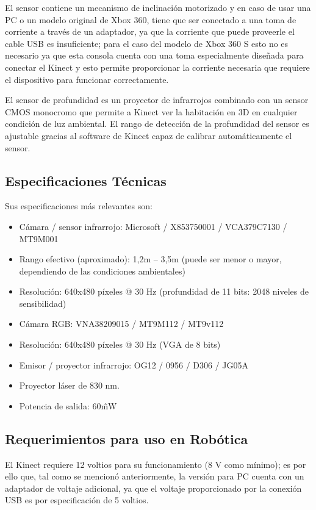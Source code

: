 El sensor contiene un mecanismo de inclinación motorizado y en caso de usar una PC o un modelo original de Xbox 360, tiene que ser conectado a una toma de corriente a través de un adaptador, ya que la corriente que puede proveerle el cable USB es insuficiente; para el caso del modelo de Xbox 360 S esto no es necesario ya que esta consola cuenta con una toma especialmente diseñada para conectar el Kinect y esto permite proporcionar la corriente necesaria que requiere el dispositivo para funcionar correctamente.

El sensor de profundidad es un proyector de infrarrojos combinado con un sensor CMOS monocromo que permite a Kinect ver la habitación en 3D en cualquier condición de luz ambiental. El rango de detección de la profundidad del sensor es ajustable gracias al software de Kinect capaz de calibrar automáticamente el sensor.

\subsection{Especificaciones Técnicas}
Sus especificaciones \cite{openkinecthardware} \cite{ifixitkinect} más relevantes son:

\begin{itemize}
	\itemsep1pt \parskip1pt 
	\item Cámara / sensor infrarrojo: Microsoft / X853750001 / VCA379C7130 / MT9M001
	\item Rango efectivo (aproximado): 1,2m – 3,5m (puede ser menor o mayor, dependiendo de las condiciones ambientales)
	\item Resolución: 640x480 píxeles @ 30 Hz (profundidad de 11 bits: 2048 niveles de sensibilidad)
	\item Cámara RGB: VNA38209015 / MT9M112 / MT9v112
	\item Resolución: 640x480 píxeles @ 30 Hz (VGA de 8 bits)
	\item Emisor / proyector infrarrojo: OG12 / 0956 / D306 / JG05A
	\item Proyector láser de 830 nm.
	\item Potencia de salida: 60\~ mW
\end{itemize}

\subsection{Requerimientos para uso en Robótica}

El Kinect requiere 12 voltios \cite{openkinecthardware} para su funcionamiento (8 V como mínimo); es por ello que, tal como se mencionó anteriormente, la versión para PC cuenta con un adaptador de voltaje adicional, ya que el voltaje proporcionado por la conexión USB es por especificación de 5 voltios.

